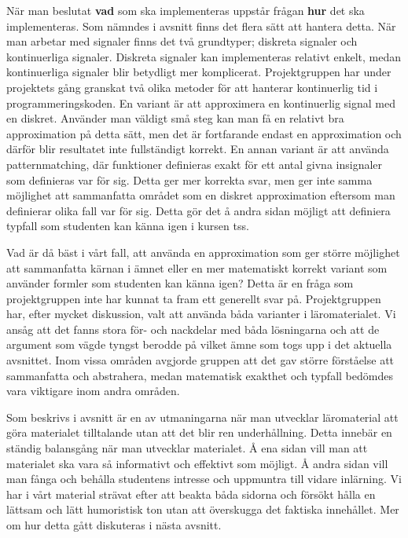 \documentclass[12pt,a4paper,twoside,openright]{article}
\begin{document}
När man beslutat \textbf{vad} som ska implementeras uppstår frågan
\textbf{hur} det ska implementeras. Som nämndes i avsnitt
 finns det flera sätt att hantera detta. När
man arbetar med signaler finns det två grundtyper; diskreta signaler
och kontinuerliga signaler. Diskreta signaler kan implementeras
relativt enkelt, medan kontinuerliga signaler blir betydligt mer
komplicerat. Projektgruppen har under projektets gång granskat två
olika metoder för att hanterar kontinuerlig tid i
programmeringskoden. En variant är att approximera en kontinuerlig
signal med en diskret. Använder man väldigt små steg kan man få en
relativt bra approximation på detta sätt, men det är fortfarande
endast en approximation och därför blir resultatet inte fullständigt
korrekt.
En annan variant är att använda \gls{patternmatching}, där funktioner
definieras exakt för ett antal givna insignaler som definieras var för
sig. Detta ger mer korrekta svar, men ger inte samma möjlighet att
sammanfatta
området som en diskret approximation eftersom man definierar olika
fall var för sig. Detta gör det å andra sidan möjligt att definiera
typfall som studenten kan känna igen i kursen \gls{tss}.

Vad är då bäst i vårt fall, att använda en approximation som ger
större möjlighet att %
sammanfatta kärnan i ämnet eller en mer matematiskt korrekt variant
som använder formler som studenten kan känna igen? Detta är en fråga
som projektgruppen inte har kunnat ta fram ett generellt svar
på. Projektgruppen har, efter mycket diskussion, valt att använda båda
varianter i läromaterialet. Vi ansåg att det fanns stora för- och
nackdelar med båda lösningarna och att de argument som vägde tyngst
berodde på vilket ämne som togs upp i det aktuella avsnittet. Inom
vissa områden avgjorde gruppen att det gav större förståelse att
sammanfatta och abstrahera, medan matematisk exakthet och typfall
bedömdes vara viktigare inom andra områden.

Som beskrivs i avsnitt  är en av utmaningarna
när man utvecklar läromaterial att göra materialet tilltalande utan
att det blir ren underhållning. Detta innebär en ständig balansgång
när man utvecklar materialet. Å ena sidan vill man att materialet ska
vara så informativt och effektivt som möjligt. Å andra sidan vill man
fånga och behålla studentens intresse och uppmuntra till vidare
inlärning. Vi har i vårt material strävat efter att beakta båda
sidorna och försökt hålla en lättsam och lätt humoristisk ton utan att
överskugga det faktiska innehållet. Mer om hur detta gått diskuteras i
nästa avsnitt.
\end{document}
